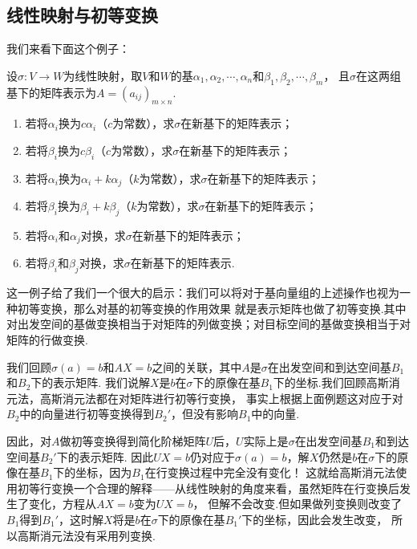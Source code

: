\subsection{线性映射与初等变换}
我们来看下面这个例子：
\begin{example}
    设$\sigma:V\to W$为线性映射，取$V$和$W$的基$\alpha_1,\alpha_2,\cdots,\alpha_n$和$\beta_1,\beta_2,\cdots,\beta_m$，
    且$\sigma$在这两组基下的矩阵表示为$A=(a_{ij})_{m\times n}$.
    \begin{enumerate}[label=(\arabic*)]
        \item 若将$\alpha_i$换为$c\alpha_i$（$c$为常数），求$\sigma$在新基下的矩阵表示；
        \item 若将$\beta_i$换为$c\beta_i$（$c$为常数），求$\sigma$在新基下的矩阵表示；
        \item 若将$\alpha_i$换为$\alpha_i+k\alpha_j$（$k$为常数），求$\sigma$在新基下的矩阵表示；
        \item 若将$\beta_i$换为$\beta_i+k\beta_j$（$k$为常数），求$\sigma$在新基下的矩阵表示；
        \item 若将$\alpha_i$和$\alpha_j$对换，求$\sigma$在新基下的矩阵表示；
        \item 若将$\beta_i$和$\beta_j$对换，求$\sigma$在新基下的矩阵表示.
    \end{enumerate}
\end{example}
\begin{solution}

\end{solution}

这一例子给了我们一个很大的启示：我们可以将对于基向量组的上述操作也视为一种初等变换，那么对基的初等变换的作用效果
就是表示矩阵也做了初等变换.其中对出发空间的基做变换相当于对矩阵的列做变换；对目标空间的基做变换相当于对矩阵的行做变换.

我们回顾$\sigma(a)=b$和$AX=b$之间的关联，其中$A$是$\sigma$在出发空间和到达空间基$B_1$和$B_2$下的表示矩阵.
我们说解$X$是$b$在$\sigma$下的原像在基$B_1$下的坐标.我们回顾高斯消元法，高斯消元法都在对矩阵进行初等行变换，
事实上根据上面例题这对应于对$B_2$中的向量进行初等变换得到$B_2'$，但没有影响$B_1$中的向量.

因此，对$A$做初等变换得到简化阶梯矩阵$U$后，$U$实际上是$\sigma$在出发空间基$B_1$和到达空间基$B_2'$下的表示矩阵.
因此$UX=b$仍对应于$\sigma(a)=b$，解$X$仍然是$b$在$\sigma$下的原像在基$B_1$下的坐标，因为$B_1$在行变换过程中完全没有变化！
这就给高斯消元法使用初等行变换一个合理的解释——从线性映射的角度来看，虽然矩阵在行变换后发生了变化，方程从$AX=b$变为$UX=b$，
但解不会改变.但如果做列变换则改变了$B_1$得到$B_1'$，这时解$X$将是$b$在$\sigma$下的原像在基$B_1'$下的坐标，因此会发生改变，
所以高斯消元法没有采用列变换.

